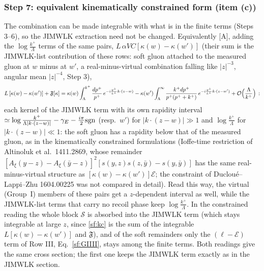 \documentclass[10pt]{article}
\begin{document}
\subsubsection{Step 7: equivalent kinematically constrained form (item (c))}
\noindent The combination can be made integrable with what is in the finite terms (Steps 3--6), so the JIMWLK extraction need not be changed. Equivalently [A], adding the $\log\frac{k^{+}}{\Lambda}$ terms of the same pairs, $L\,\alpha V C[\kappa(w)-\kappa(w')]$ (their sum is the JIMWLK-list contribution of these rows: soft gluon attached to the measured gluon at $w$ minus at $w'$, a real-minus-virtual combination falling like $|z|^{-3}$, angular mean $|z|^{-4}$, Step 3),
\begin{align}
L\,[\kappa(w)-\kappa(w')]+\mathfrak{F}[\kappa]=\kappa(w)\int_{\Lambda}^{k^{+}}\frac{dp^{+}}{p^{+}}\,e^{-i\frac{p^{+}}{k^{+}}k\cdot(z-w)}-\kappa(w')\int_{\Lambda}^{\infty}\frac{k^{+}dp^{+}}{p^{+}(p^{+}+k^{+})}\,e^{-i\frac{p^{+}}{k^{+}}k\cdot(z-w')}+{\cal O}\Big(\frac{\Lambda}{k^{+}}\Big)\,:\label{sf:kc}
\end{align}
each kernel of the JIMWLK term with its own rapidity interval $\simeq\log\frac{k^{+}}{\Lambda|k\cdot(z-w)|}-\gamma_{E}-\frac{i\pi}{2}{\rm sgn}$ (resp.\ $w'$) for $|k\cdot(z-w)|\gg1$ and $\log\frac{k^{+}}{\Lambda}$ for $|k\cdot(z-w)|\ll1$: the soft gluon has a rapidity below that of the measured gluon, as in the kinematically constrained formulations (Ioffe-time restriction of Altinoluk et al.\ 1411.2869, whose remainder $[A_{\xi}(y-z)-A_{\xi}(\bar y-z)]^{2}[s(y,z)s(z,\bar y)-s(y,\bar y)]$ has the same real-minus-virtual structure as $[\kappa(w)-\kappa(w')]\mathcal{E}$; the constraint of Ducloué--Lappi--Zhu 1604.00225 was not compared in detail). Read this way, the virtual (Group~I) members of these pairs get a $z$-dependent interval as well, while the JIMWLK-list terms that carry no recoil phase keep $\log\frac{k^{+}}{\Lambda}$. In the constrained reading the whole block $\mathcal{S}$ is absorbed into the JIMWLK term (which stays integrable at large $z$, since \eqref{sf:kc} is the sum of the integrable $L[\kappa(w)-\kappa(w')]$ and $\mathfrak{F}$), and of the soft remainders only the $(\ell-\mathcal{E})$ term of Row III, Eq.~\eqref{sf:GIIII}, stays among the finite terms. Both readings give the same cross section; the first one keeps the JIMWLK term exactly as in the JIMWLK section.
\end{document}
